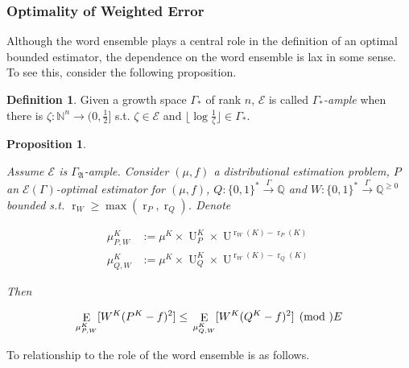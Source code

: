 \documentclass{article}
\numberwithin{equation}{section}
\theoremstyle{definition}
\newtheorem{definition}{Definition}[section]
\theoremstyle{plain}
\newtheorem{proposition}{Proposition}[section]
\newcommand{\Bool}{\{0,1\}}
\newcommand{\Words}{{\Bool^*}}
\DeclareMathOperator{\E}{E}
\DeclareMathOperator{\R}{r}
\DeclareMathOperator{\Un}{U}
\newcommand{\Nats}{\mathbb{N}}
\newcommand{\Rats}{\mathbb{Q}}
\newcommand{\NatFun}{\Nats^n \rightarrow}
\newcommand{\Floor}[1]{\lfloor #1 \rfloor}
\newcommand{\GrowA}{\Gamma_{\mathfrak{A}}}
\newcommand{\Fall}{\mathcal{E}}
\newcommand{\EG}{\Fall(\Gamma)}
\newcommand{\Scheme}{\xrightarrow{\Gamma}}
\begin{document}
\subsubsection{Optimality of Weighted Error}

Although the word ensemble plays a central role in the definition of an optimal bounded estimator, the dependence on the word ensemble is lax in some sense. To see this, consider the following proposition.

\begin{definition}

Given a growth space $\Gamma_*$ of rank $n$, $\Fall$ is called \emph{$\Gamma_*$-ample} when there is $\zeta: \NatFun (0,\frac{1}{2}]$ s.t.  $\zeta \in \Fall$ and $\Floor{\log \frac{1}{\zeta}} \in \Gamma_*$.

\end{definition}

\begin{proposition}
\label{prp:weight}

Assume $\Fall$ is $\GrowA$-ample. Consider $(\mu,f)$ a distributional estimation problem, $P$ an $\EG$-optimal estimator for $(\mu,f)$, $Q: \Words \Scheme \Rats$ and ${W: \Words \Scheme \Rats^{\geq 0}}$ bounded s.t. ${\R_W \geq \max(\R_P, \R_Q)}$. Denote 

\begin{align*}
\mu^{K}_{P,W} &:=\mu^{K} \times \Un_P^{K} \times \Un^{\R_W(K)-\R_P(K)} \\
\mu^{K}_{Q,W} &:=\mu^{K} \times \Un_Q^{K} \times \Un^{\R_W(K)-\R_Q(K)}
\end{align*}

Then

\begin{equation}
\E_{\mu^{K}_{P,W}}[W^{K}(P^{K} - f)^2] \leq \\ \E_{\mu^{K}_{Q,W}}[W^{K}(Q^{K} - f)^2] \pmod \Fall
\end{equation}

\end{proposition}

To relationship to the role of the word ensemble is as follows.
\end{document}
